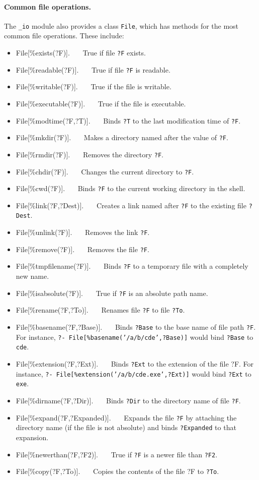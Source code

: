 \documentclass[11pt]{article}
\begin{document}
\paragraph{Common file operations.}
The {\tt \_io} module also provides a class {\tt File}, which has methods
for the most common file operations. These include:
\begin{itemize}
\item  File[\%exists(?F)].~~~
  True if file {\tt ?F} exists. 
\item File[\%readable(?F)].~~~
  True if file {\tt ?F} is readable. 
\item File[\%writable(?F)].~~~
  True if the file is writable.
\item File[\%executable(?F)].~~~
  True if the file is executable.
\item File[\%modtime(?F,?T)].~~~
  Binds {\tt ?T} to the last modification time of {\tt ?F}.  
\item File[\%mkdir(?F)].~~~
  Makes a directory named after the value of {\tt ?F}. 
\item File[\%rmdir(?F)].~~~
  Removes the directory {\tt ?F}. 
\item File[\%chdir(?F)].~~~
  Changes the current directory to {\tt ?F}. 
\item File[\%cwd(?F)].~~~
  Binds {\tt ?F} to the current working directory in the shell. 
\item File[\%link(?F,?Dest)].~~~
  Creates a link named after {\tt ?F} to the existing file {\tt ?Dest}.  
\item File[\%unlink(?F)].~~~
  Removes the link {\tt ?F}. 
\item File[\%remove(?F)].~~~
  Removes the file {\tt ?F}. 
\item File[\%tmpfilename(?F)].~~~
  Binds {\tt ?F} to a temporary file with a completely new name. 
\item File[\%isabsolute(?F)].~~~
  True if {\tt ?F} is an absolute path name. 
\item File[\%rename(?F,?To)].~~~
  Renames file {\tt ?F} to file {\tt ?To}.  
\item File[\%basename(?F,?Base)].~~~
  Binds {\tt ?Base} to the base name of file path {\tt ?F}. For instance, 
  {\tt ?- File[\%basename('/a/b/cde',?Base)]} would bind {\tt ?Base} to {\tt
    cde}.  
\item File[\%extension(?F,?Ext)].~~~
  Binds {\tt ?Ext} to the extension of the file ?F. For instance, 
  {\tt ?- File[\%extension('/a/b/cde.exe',?Ext)]} would bind {\tt ?Ext} to {\tt
    exe}.  
\item File[\%dirname(?F,?Dir)].~~~
  Binds {\tt ?Dir} to the directory name of file {\tt ?F}.  
\item File[\%expand(?F,?Expanded)].~~~
  Expands the file {\tt ?F} by attaching the directory name (if the file is
  not absolute) and binds {\tt ?Expanded} to that expansion.  
\item File[\%newerthan(?F,?F2)].~~~
  True if {\tt ?F} is a newer file than {\tt ?F2}. 
\item File[\%copy(?F,?To)].~~~
  Copies the contents of the file ?F to {\tt ?To}. 
\end{itemize}
\end{document}
